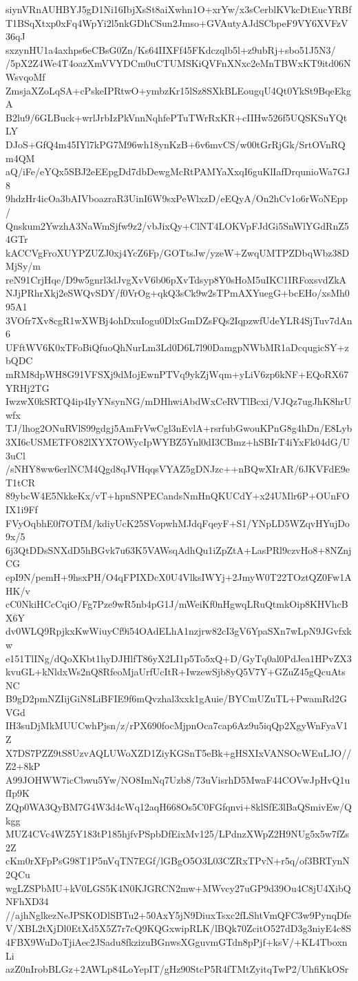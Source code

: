 siynVRnAUHBYJ5gD1Ni16IbjXsSt8aiXwhn1O+xrYw/x3sCerblKVkcDtEucYRBf
T1BSqXtxp0xFq4WpYi2l5nkGDhCSun2Jmso+GVAutyAJdSCbpeF9VY6XVFzV36qJ
sxzynHU1a4axhps6eCBsG0Zn/Ks64IIXFf45FKdczqlb5l+z9ubRj+sbo51J5N3/
/5pX2Z4We4T4oazXmVVYDCm0uCTUMSKiQVFnXNxc2eMnTBWxKT9itd06NWsvqoMf
ZmsjaXZoLqSA+cPskeIPRtwO+ymbzKr15lSz8SXkBLEougqU4Qt0YkSt9BqeEkgA
B2lu9/6GLBuck+wrlJrbIzPkVnnNqhfePTuTWrRxKR+cIIHw526f5UQSKSuYQtLY
DJoS+GfQ4m45IYl7kPG7M96wh18ynKzB+6v6mvCS/w00tGrRjGk/SrtOVnRQm4QM
aQ/iFe/eYQx5SBJ2eEEpgDd7dbDewgMcRtPAMYaXxqI6guKlIafDrqunioWa7GJ8
9hdzHr4icOa3bAIVboazraR3UinI6W9sxPeWlxzD/eEQyA/On2hCv1o6rWoNEpp/
Qnskum2YwzhA3NaWmSjfw9z2/vbJixQy+ClNT4LOKVpFJdGi5SnWlYGdRnZ54GTr
kACCVgFroXUYPZUZJ0xj4YcZ6Fp/GOTtsJw/yzeW+ZwqUMTPZDbqWbz38DMjSy/m
reN91CrjHqe/D9w5gnrl3dJvgXvV6b06pXvTdsyp8Y0sHoM5uIKC1IRFoxsvdZkA
NJjPRhrXkj2eSWQvSDY/f0VrOg+qkQ3sCk9w2sTPmAXYuegG+bcEHo/xsMh095A1
3VOfr7Xv8cgR1wXWBj4ohDxuIogu0DlxGmDZsFQs2IqpzwfUdeYLR4SjTuv7dAn6
UFftWV6K0xTFoBiQfuoQhNurLm3Ld0D6L7l90DamgpNWbMR1aDcqugicSY+zbQDC
mRM8dpWH8G91VFSXj9dMojEwnPTVq9ykZjWqm+yLiV6zp6kNF+EQoRX67YRHj2TG
IwzwX0kSRTQ4ip4IyYNsynNG/mDHhwiAbdWxCeRVTlBcxi/VJQz7ugJhK8hrUwfx
TJ/lhog2ONuRVlS99gdgj5AmFrVwCgl3nEvlA+rsrfubGwouKPnG8g4hDn/E8Lyb
3XI6cUSMETFO82lXYX7OWycIpWYBZ5Ynl0dI3CBmz+hSBIrT4iYxFk04dG/U3uCl
/sNHY8ww6erlNCM4Qgd8qJVHqqsVYAZ5gDNJzc++nBQwXIrAR/6JKVFdE9eT1tCR
89ybcW4E5NkkeKx/vT+hpnSNPECandsNmHnQKUCdY+x24UMlr6P+OUnFOIX1i9Ff
FVyOqbhE0f7OTfM/kdiyUcK25SVopwhMJdqFqeyF+S1/YNpLD5WZqvHYujDo9x/5
6j3QtDDsSNXdD5hBGvk7u63K5VAWsqAdhQu1iZpZtA+LasPRl9czvHo8+8NZnjCG
epI9N/pemH+9hsxPH/O4qFPIXDcX0U4VlksIWYj+2JmyW0T22TOztQZ0Fw1AHK/v
cC0NkiHCcCqiO/Fg7Pze9wR5nb4pG1J/mWeiKf0nHgwqLRuQtmkOip8KHVhcBX6Y
dv0WLQ9RpjkxKwWiuyCf9i54OAdELhA1nzjrw82cI3gV6YpaSXn7wLpN9JGvfxkw
e151TlINg/dQoXKbt1hyDJHlfT86yX2LI1p5To5xQ+D/GyTq0al0PdJea1HPvZX3
kvuGL+kNldxWs2nQ8RfeoMjaUrfUcItR+IwzewSjb8yQ5V7Y+GZuZ45gQcuAtsNC
B9gD2pmNZIijGiN8LiBFIE9f6mQvzhal3xxk1gAuie/BYCmUZuTL+PwamRd2GVGd
IH3suDjMkMUUCwhPjsn/z/rPX690focMjpnOca7cap6Az9u5iqQp2XgyWnFyaV1Z
X7DS7PZZ9tS8UzvAQLUWoXZD1ZiyKGSnT5eBk+gHSXIxVANSOcWEuLJO//Z2+8kP
A99JOHWW7icCbwu5Yw/NO8ImNq7Uzb8/73uVisrhD5MwaF44COVwJpHvQ1ufIp9K
ZQp0WA3QyBM7G4W3d4cWq12aqH668Os5C0FGfqnvi+8klSfE3lBaQSmivEw/Qkgg
MUZ4CVc4WZ5Y183tP185hjfvPSpbDfEixMv125/LPdnzXWpZ2H9NUg5x5w7fZs2Z
cKm0rXFpPsG98T1P5nVqTN7EGf/lGBgO5O3L03CZRxTPvN+r5q/of3BRTynN2QCu
wgLZSPbMU+kV0LGS5K4N0KJGRCN2mw+MWvcy27uGP9d39Ou4C8jU4XibQNFhXD34
//ajhNglkezNeJPSKODlSBTu2+50AxY5jN9DiuxTsxc2fLShtVmQFC3w9PynqDfe
V/XBL2tXjDl0EtXd5X5Z7r7cQ9KQGxwipRLK/lBQk70ZcitO527dD3g3niyE4c8S
4FBX9WuDoTjiAec2JSadu8fkzizuBGnwsXGguvmGTdn8pPjf+ksV/+KL4TboxnLi
azZ0nIrobBLGz+2AWLp84LoYepIT/gHz90StcP5R4fTMtZyitqTwP2/UhfiKkOSr
